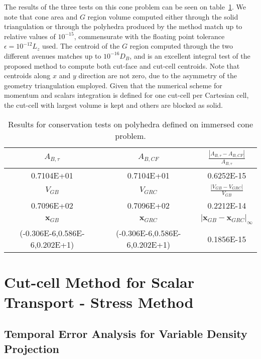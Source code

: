 \documentclass[11pt]{book}
\begin{document}
The results of the three tests on this cone problem can be seen on table~\ref{tab:cone_res}. We note that cone area and $G$ region volume computed either through the solid triangulation or through the polyhedra produced by the method match up to relative values of $10^{-15}$, commensurate with the floating point tolerance $\epsilon=10^{-12}L_z$ used. The centroid of the $G$ region computed through the two different avenues matches up to $10^{-16}D_B$, and is an excellent integral test of the proposed method to compute both cut-face and cut-cell centroids. Note that centroids along $x$ and $y$ direction are not zero, due to the asymmetry of the geometry triangulation employed. Given that the numerical scheme for momentum and scalars integration is defined for one cut-cell per Cartesian cell, the cut-cell with largest volume is kept and others are blocked as solid.
%
\begin{table}[h]
  \centering
  \begin{tabular}[\textwidth]{c|c|c}
    \hline \hline
      $A_{B,\tau}$ & $A_{B,CF}$ & $\frac{|A_{B,\tau}-A_{B,CF} |}{A_{B,\tau}}$ \\ \hline
       {0.7104E+01} & {0.7104E+01} & {0.6252E-15} \\
    \hline \hline
      $V_{GB}$ & $V_{GRC}$ & $\frac{|V_{GB}-V_{GRC}|}{V_{GB}}$ \\  \hline
      {0.7096E+02} & {0.7096E+02} & {0.2212E-14} \\
    \hline \hline
    $\mathbf{x}_{GB}$ & $\mathbf{x}_{GRC}$ & $|\mathbf{x}_{GB}-\mathbf{x}_{GRC}|_\infty$ \\
    \hline \hline
    {(-0.306E-6,0.586E-6,0.202E+1)} &
    {(-0.306E-6,0.586E-6,0.202E+1)} &
    {0.1856E-15} \\
    \hline
  \end{tabular}
  \caption[Conservation tests for polyhedra]{Results for conservation tests on polyhedra defined on immersed cone problem.}
  \label{tab:cone_res}
\end{table}
%


\section{Cut-cell Method for Scalar Transport - Stress Method}

\subsection{Temporal Error Analysis for Variable Density Projection}
\end{document}
